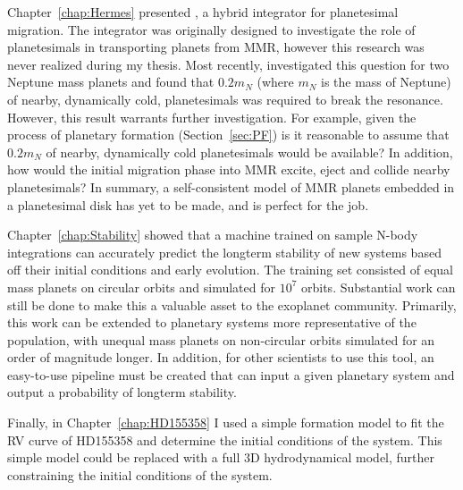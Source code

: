 Chapter~\ref{chap:Hermes} presented \hermes, a hybrid integrator for planetesimal migration. 
The integrator was originally designed to investigate the role of planetesimals in transporting planets from MMR, however this research was never realized during my thesis. 
Most recently, \citet{Chatterjee2015} investigated this question for two Neptune mass planets and found that $0.2m_N$ (where $m_N$ is the mass of Neptune) of nearby, dynamically cold, planetesimals was required to break the resonance. 
However, this result warrants further investigation. 
For example, given the process of planetary formation (Section~\ref{sec:PF}) is it reasonable to assume that $0.2m_N$ of nearby, dynamically cold planetesimals would be available?
In addition, how would the initial migration phase into MMR excite, eject and collide nearby planetesimals?
In summary, a self-consistent model of MMR planets embedded in a planetesimal disk has yet to be made, and \hermes is perfect for the job.

Chapter~\ref{chap:Stability} showed that a machine trained on sample N-body integrations can accurately predict the longterm stability of new systems based off their initial conditions and early evolution. 
The training set consisted of equal mass planets on circular orbits and simulated for $10^7$ orbits. 
Substantial work can still be done to make this a valuable asset to the exoplanet community.
Primarily, this work can be extended to planetary systems more representative of the \kep population, with unequal mass planets on non-circular orbits simulated for an order of magnitude longer. 
In addition, for other scientists to use this tool, an easy-to-use pipeline must be created that can input a given planetary system and output a probability of longterm stability. 

Finally, in Chapter~\ref{chap:HD155358} I used a simple formation model to fit the RV curve of HD155358 and determine the initial conditions of the system. 
This simple model could be replaced with a full 3D hydrodynamical model, further constraining the initial conditions of the system. 

